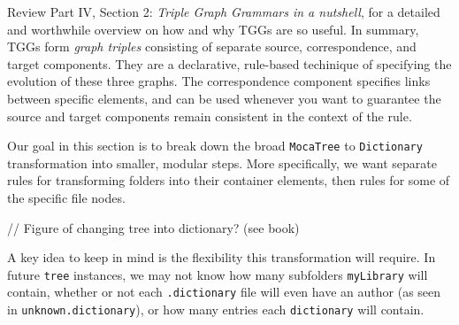 
Review Part IV, Section 2: \emph{Triple Graph Grammars in a nutshell}, for a detailed and worthwhile overview on how and why TGGs are so useful. In summary,
TGGs form \emph{graph triples} consisting of separate source, correspondence, and target components. They are a declarative, rule-based techinique of specifying
the evolution of these three graphs. The correspondence component specifies links between specific elements, and can be used whenever you want to guarantee the
source and target components remain consistent in the context of the rule.

Our goal in this section is to break down the broad \texttt{MocaTree} to \texttt{Dictionary} transformation into smaller, modular steps. More specifically, we
want separate rules for transforming folders into their container elements, then rules for some of the specific file nodes.

// Figure of changing tree into dictionary? (see book)

A key idea to keep in mind is the flexibility this transformation will require. In future \texttt{tree} instances, we may not know how many subfolders
\texttt{myLibrary} will contain, whether or not each \texttt{.dictionary} file will even have an author (as seen in \texttt{unknown.dictionary}), or how many
entries each \texttt{dictionary} will contain.

